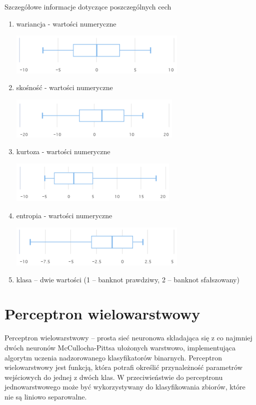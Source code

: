 \documentclass{classrep}
\begin{document}
Szczegółowe informacje dotyczące poszczególnych cech
\begin{enumerate}
\item wariancja - wartości numeryczne
\begin{center}
	\includegraphics[height=2cm]{wariancja.png}
\end{center}
\item skośność - wartości numeryczne
\begin{center}
	\includegraphics[height=2cm]{skosnosc.png}
\end{center}
\item kurtoza - wartości numeryczne
\begin{center}
	\includegraphics[height=2cm]{kurtoza.png}
\end{center}
\item entropia - wartości numeryczne
\begin{center}
	\includegraphics[height=2cm]{entropia.png}
\end{center}
\item klasa – dwie wartości (1 – banknot prawdziwy, 2 – banknot sfałszowany)
\end{enumerate}


\section{Perceptron wielowarstwowy}

Perceptron wielowarstwowy – prosta sieć neuronowa składająca się z co najmniej dwóch neuronów McCullocha-Pittsa ułożonych warstwowo, implementująca algorytm uczenia nadzorowanego klasyfikatorów binarnych. Perceptron wielowarstwowy jest funkcją, która potrafi określić przynależność parametrów wejściowych do jednej z dwóch klas. W przeciwieństwie do perceptronu jednowarstwowego może być wykorzystywany do klasyfikowania zbiorów, które nie są liniowo separowalne.
\end{document}
